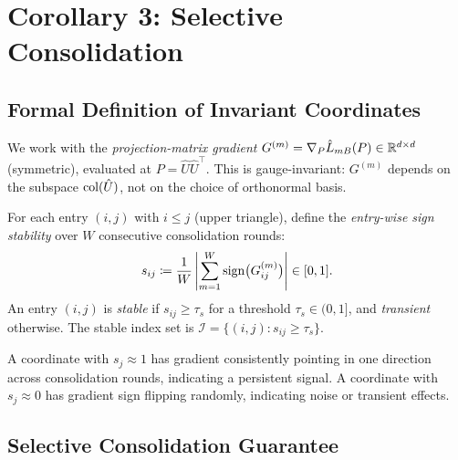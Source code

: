\section{Corollary 3: Selective Consolidation}
\label{sec:cor3}

\subsection{Formal Definition of Invariant Coordinates}

\begin{definition}
\label{def:gradient-sign-stability}
We work with the \emph{projection-matrix gradient}
$G^{(m)} = \nabla_P \hat{L}_{mB}(P) \in \mathbb{R}^{d \times d}$ (symmetric),
evaluated at $P = \hat{U}\hat{U}^\top$. This is gauge-invariant:
$G^{(m)}$ depends on the subspace $\mathrm{col}(\hat{U})$, not on the
choice of orthonormal basis.

For each entry $(i,j)$ with $i \leq j$ (upper triangle),
define the \emph{entry-wise sign stability} over $W$ consecutive
consolidation rounds:
\[
  s_{ij} \coloneqq \frac{1}{W}\left|\sum_{m=1}^W
  \mathrm{sign}\bigl(G^{(m)}_{ij}\bigr)\right| \in [0, 1].
\]
An entry $(i,j)$ is \emph{stable} if $s_{ij} \geq \tau_s$ for a
threshold $\tau_s \in (0, 1]$, and \emph{transient} otherwise.
The stable index set is $\mathcal{I} = \{(i,j) : s_{ij} \geq \tau_s\}$.
\end{definition}

\begin{remark}[Interpretation]
A coordinate with $s_j \approx 1$ has gradient consistently pointing
in one direction across consolidation rounds, indicating a persistent
signal. A coordinate with $s_j \approx 0$ has gradient sign flipping
randomly, indicating noise or transient effects.
\end{remark}

\subsection{Selective Consolidation Guarantee}

